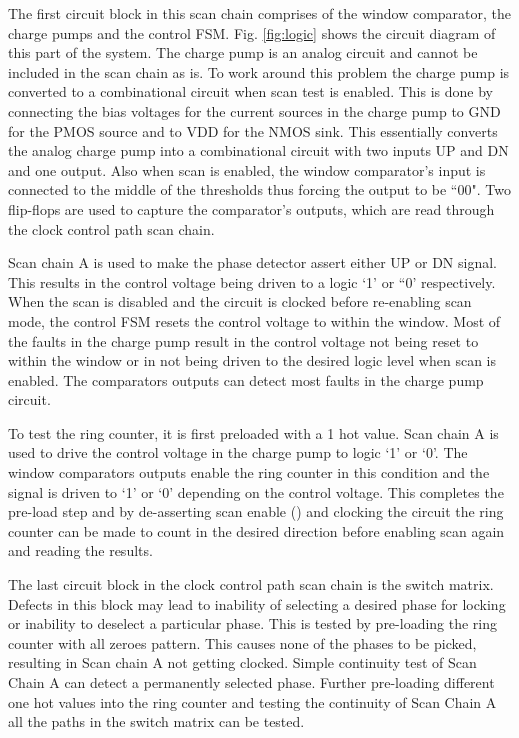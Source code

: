 \documentclass[conference]{IEEEtran}
\begin{document}
The first
circuit block in this scan chain comprises of the window comparator, the
charge pumps and the control FSM. Fig. \ref{fig:logic} shows the
circuit diagram of this part of the system. The charge pump
is an analog circuit and cannot be included in the scan chain 
as is. To work around this problem the charge pump
is converted to a combinational circuit when scan test is enabled.
This is done by connecting 
the bias voltages for the current sources in the charge pump
to GND for the PMOS source and to VDD for the NMOS sink. 
This
essentially converts the analog charge pump into a combinational
circuit with two inputs UP and DN and one output. Also when scan is
enabled, the window comparator's input is connected to the middle of
the thresholds thus forcing the output to be ``00". 
Two flip-flops are used to capture the comparator's outputs, which
are read through the clock control path scan chain.

Scan chain A is used to make the phase detector assert either UP
or DN signal. This results in the control voltage  being driven
to a logic `1' or ``0' respectively. When the scan is disabled and 
the circuit is clocked before re-enabling scan mode, the control FSM
resets the control voltage to within the window. Most of the
faults in the charge pump result in the control voltage not 
being reset to within the window or in not being driven to 
the desired logic level when scan is enabled. 
The comparators outputs can detect most faults in the charge pump circuit.

To test the ring counter, it is first preloaded with a 1 hot value. 
Scan chain A is used to drive the
control voltage in the charge pump to logic `1' or `0'. The 
window comparators outputs enable the ring counter in this
condition and the  signal is driven to `1' 
or `0' depending on the control voltage. This completes the pre-load
step and by de-asserting scan enable () and clocking
the circuit the ring counter can be made to count in the desired 
direction before enabling scan again and reading the results.

The last circuit block in the clock control path scan chain is the
switch matrix. Defects in this block may lead to inability of selecting
a desired phase for locking or inability to deselect a particular phase.
This is tested by pre-loading the ring counter with all zeroes pattern. This
causes none of the phases to be picked, resulting in Scan chain A not getting
clocked.
Simple continuity test of Scan Chain A can detect a permanently selected phase.
Further pre-loading different one hot values into the ring counter and testing 
the continuity of
Scan Chain A all the paths in the switch matrix can be tested.
\end{document}

